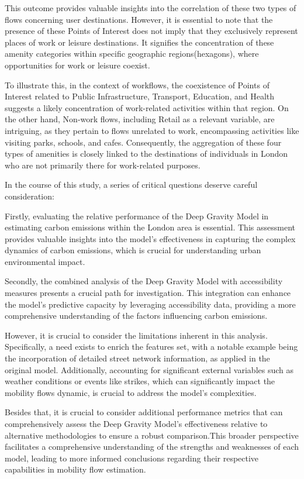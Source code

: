         This outcome provides valuable insights into the correlation of these two types of flows concerning user destinations. However, it is essential to note that the presence of these Points of Interest does not imply that they exclusively represent places of work or leisure destinations. It signifies the concentration of these amenity categories within specific geographic regions(hexagons), where opportunities for work or leisure coexist.

        To illustrate this, in the context of workflows, the coexistence of Points of Interest related to Public Infrastructure, Transport, Education, and Health suggests a likely concentration of work-related activities within that region. On the other hand, Non-work flows, including Retail as a relevant variable, are intriguing, as they pertain to flows unrelated to work, encompassing activities like visiting parks, schools, and cafes. Consequently, the aggregation of these four types of amenities is closely linked to the destinations of individuals in London who are not primarily there for work-related purposes.
        
        In the course of this study, a series of critical questions deserve careful consideration:
        
        Firstly, evaluating the relative performance of the Deep Gravity Model in estimating carbon emissions within the London area is essential. This assessment provides valuable insights into the model's effectiveness in capturing the complex dynamics of carbon emissions, which is crucial for understanding urban environmental impact.
        
        Secondly, the combined analysis of the Deep Gravity Model with accessibility measures presents a crucial path for investigation. This integration can enhance the model's predictive capacity by leveraging accessibility data, providing a more comprehensive understanding of the factors influencing carbon emissions.
        
        However, it is crucial to consider the limitations inherent in this analysis. Specifically, a need exists to enrich the features set, with a notable example being the incorporation of detailed street network information, as applied in the original model. Additionally, accounting for significant external variables such as weather conditions or events like strikes, which can significantly impact the mobility flows dynamic, is crucial to address the model's complexities.
        
        Besides that, it is crucial to consider additional performance metrics that can comprehensively assess the Deep Gravity Model's effectiveness relative to alternative methodologies to ensure a robust comparison.This broader perspective facilitates a comprehensive understanding of the strengths and weaknesses of each model, leading to more informed conclusions regarding their respective capabilities in mobility flow estimation. 

